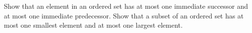 \documentclass[../main.tex]{subfiles}
\begin{document}
\problem{}\label{s3p11}

Show that an element in an ordered set has at most one immediate successor and
at most one immediate predecessor. Show that a subset of an ordered set has at
most one smallest element and at most one largest element.

\todo{}
\end{document}
